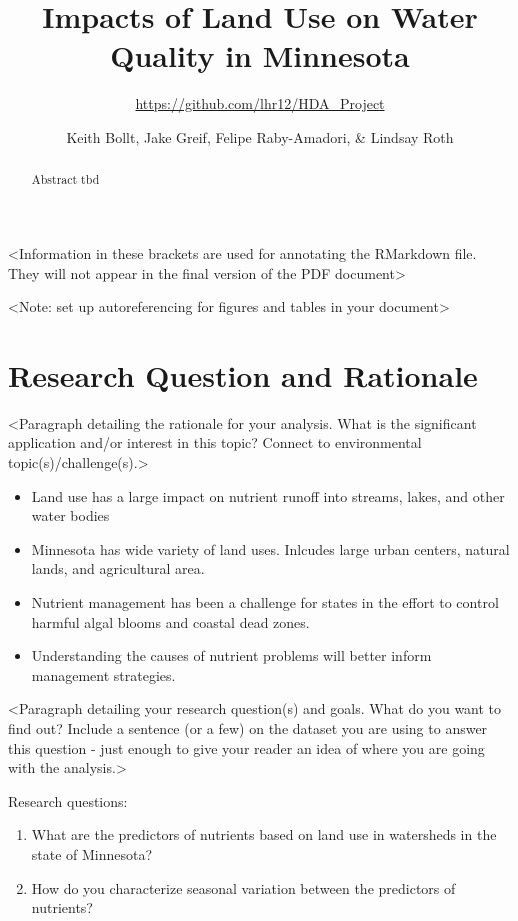 \documentclass[12pt,]{article}
\title{Impacts of Land Use on Water Quality in Minnesota}
\subtitle{\url{https://github.com/lhr12/HDA_Project}}
\author{Keith Bollt, Jake Greif, Felipe Raby-Amadori, \& Lindsay Roth}
\date{}
\providecommand{\tightlist}{%
  \setlength{\itemsep}{0pt}\setlength{\parskip}{0pt}}
\begin{document}
\maketitle
\begin{abstract}
Abstract tbd
\end{abstract}

\textless{}Information in these brackets are used for annotating the
RMarkdown file. They will not appear in the final version of the PDF
document\textgreater{}

\newpage
\tableofcontents 
\newpage
\listoftables 
\newpage
\listoffigures 
\newpage

\textless{}Note: set up autoreferencing for figures and tables in your
document\textgreater{}

\hypertarget{research-question-and-rationale}{%
\section{Research Question and
Rationale}\label{research-question-and-rationale}}

\textless{}Paragraph detailing the rationale for your analysis. What is
the significant application and/or interest in this topic? Connect to
environmental topic(s)/challenge(s).\textgreater{}

\begin{itemize}
\tightlist
\item
  Land use has a large impact on nutrient runoff into streams, lakes,
  and other water bodies
\item
  Minnesota has wide variety of land uses. Inlcudes large urban centers,
  natural lands, and agricultural area.
\item
  Nutrient management has been a challenge for states in the effort to
  control harmful algal blooms and coastal dead zones.
\item
  Understanding the causes of nutrient problems will better inform
  management strategies.
\end{itemize}

\textless{}Paragraph detailing your research question(s) and goals. What
do you want to find out? Include a sentence (or a few) on the dataset
you are using to answer this question - just enough to give your reader
an idea of where you are going with the analysis.\textgreater{}

Research questions:

\begin{enumerate}
\def\labelenumi{\arabic{enumi}.}
\item
  What are the predictors of nutrients based on land use in watersheds
  in the state of Minnesota?
\item
  How do you characterize seasonal variation between the predictors of
  nutrients?
\end{enumerate}
\end{document}
